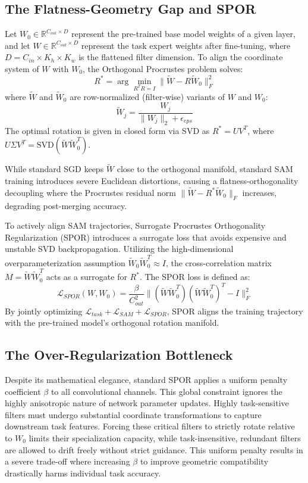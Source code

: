 \documentclass{article}
\theoremstyle{plain}
\theoremstyle{definition}
\theoremstyle{remark}
\begin{document}
\subsection{The Flatness-Geometry Gap and SPOR}
Let $W_0 \in \mathbb{R}^{C_{out} \times D}$ represent the pre-trained base model weights of a given layer, and let $W \in \mathbb{R}^{C_{out} \times D}$ represent the task expert weights after fine-tuning, where $D = C_{in} \times K_h \times K_w$ is the flattened filter dimension. To align the coordinate system of $W$ with $W_0$, the Orthogonal Procrustes problem solves:
\begin{equation}
    R^* = \arg \min_{R^T R = I} \| \tilde{W} - R \tilde{W}_0 \|_F^2
\end{equation}
where $\tilde{W}$ and $\tilde{W}_0$ are row-normalized (filter-wise) variants of $W$ and $W_0$:
\begin{equation}
    \tilde{W}_{j} = \frac{W_j}{\|W_j\|_2 + \epsilon_{eps}}
\end{equation}
The optimal rotation is given in closed form via SVD as $R^* = U V^T$, where $U \Sigma V^T = \text{SVD}(\tilde{W} \tilde{W}_0^T)$. 

While standard SGD keeps $\tilde{W}$ close to the orthogonal manifold, standard SAM training introduces severe Euclidean distortions, causing a flatness-orthogonality decoupling where the Procrustes residual norm $\|\tilde{W} - R^* \tilde{W}_0\|_F$ increases, degrading post-merging accuracy.

To actively align SAM trajectories, Surrogate Procrustes Orthogonality Regularization (SPOR) introduces a surrogate loss that avoids expensive and unstable SVD backpropagation. Utilizing the high-dimensional overparameterization assumption $\tilde{W}_0 \tilde{W}_0^T \approx I$, the cross-correlation matrix $M = \tilde{W} \tilde{W}_0^T$ acts as a surrogate for $R^*$. The SPOR loss is defined as:
\begin{equation}
    \mathcal{L}_{SPOR}(W, W_0) = \frac{\beta}{C_{out}^2} \| (\tilde{W} \tilde{W}_0^T)(\tilde{W} \tilde{W}_0^T)^T - I \|_F^2
\end{equation}
By jointly optimizing $\mathcal{L}_{task} + \mathcal{L}_{SAM} + \mathcal{L}_{SPOR}$, SPOR aligns the training trajectory with the pre-trained model's orthogonal rotation manifold.

\subsection{The Over-Regularization Bottleneck}
Despite its mathematical elegance, standard SPOR applies a uniform penalty coefficient $\beta$ to all convolutional channels. This global constraint ignores the highly anisotropic nature of network parameter updates. Highly task-sensitive filters must undergo substantial coordinate transformations to capture downstream task features. Forcing these critical filters to strictly rotate relative to $W_0$ limits their specialization capacity, while task-insensitive, redundant filters are allowed to drift freely without strict guidance. This uniform penalty results in a severe trade-off where increasing $\beta$ to improve geometric compatibility drastically harms individual task accuracy.
\end{document}
